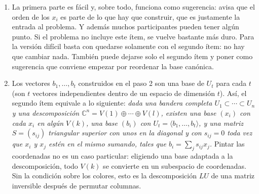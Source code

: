 \documentclass[11pt]{amsproc}
\newcommand{\C}{\mathbb{C}}
\newcommand{\gen}[1]{\langle #1\rangle}
\begin{document}
\begin{enumerate}
  \item La primera parte es fácil y, sobre todo, funciona como sugerencia:
    avisa que el orden de los $x_i$ es parte de lo que hay que construir, que
    es justamente la entrada al problema. Y además muchos participantes pueden
    tener algún punto. Si el problema no incluye este ítem, se vuelve bastante
    más duro. Para la versión difícil basta con quedarse solamente con el
    segundo ítem: no hay que cambiar nada. También puede dejarse solo el
    segundo ítem y poner como sugerencia que conviene empezar por reordenar la
    base canónica. 

  \item Los vectores $b_1,\dots,b_t$ construidos en el paso 2 son una base de
    $U_t$ para cada $t$ (son $t$ vectores independientes dentro de un espacio de
    dimensión $t$). Así, el segundo ítem equivale a lo siguiente: \emph{dada una
      bandera completa $U_1\subset\cdots\subset U_n$ y una descomposición
      $\C^n=V(1)\oplus\cdots\oplus V(l)$, existen una base $(x_i)$ con cada $x_i$
      en algún $V(k)$, una base $(b_i)$ con $U_t=\gen{b_1,\dots,b_t}$, y una
      matriz $S=(s_{ij})$ triangular superior con unos en la diagonal y con
      $s_{ij}=0$ toda vez que $x_i$ y $x_j$ estén en el mismo sumando, tales que
    $b_i=\sum_j s_{ij}x_j$.} Pintar las coordenadas no es un caso particular:
    eligiendo una base adaptada a la descomposición, todo $V(k)$ se convierte en
    un subespacio de coordenadas. Sin la condición sobre los colores, esto es la
    descomposición $LU$ de una matriz inversible después de permutar columnas.
\end{enumerate}
\end{document}
